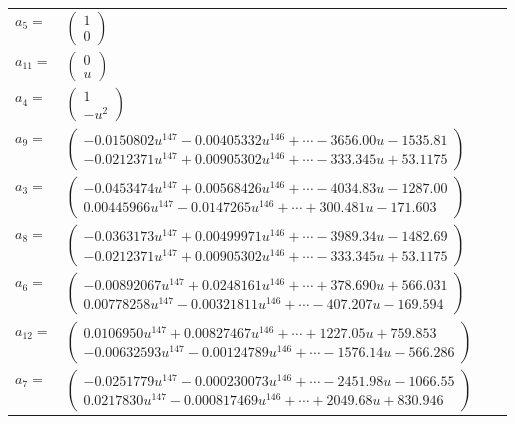 \documentclass[1p]{elsarticle_modified}
\theoremstyle{definition}
\begin{document}
\begin{tabular}{m{7pt} m{180pt} m{7pt} m{180pt} }
\flushright $a_{5}=$&$\begin{pmatrix}1\\0\end{pmatrix}$ \\
\flushright $a_{11}=$&$\begin{pmatrix}0\\u\end{pmatrix}$ \\
\flushright $a_{4}=$&$\begin{pmatrix}1\\- u^2\end{pmatrix}$ \\
\flushright $a_{9}=$&$\begin{pmatrix}-0.0150802 u^{147}-0.00405332 u^{146}+\cdots-3656.00 u-1535.81\\-0.0212371 u^{147}+0.00905302 u^{146}+\cdots-333.345 u+53.1175\end{pmatrix}$ \\
\flushright $a_{3}=$&$\begin{pmatrix}-0.0453474 u^{147}+0.00568426 u^{146}+\cdots-4034.83 u-1287.00\\0.00445966 u^{147}-0.0147265 u^{146}+\cdots+300.481 u-171.603\end{pmatrix}$ \\
\flushright $a_{8}=$&$\begin{pmatrix}-0.0363173 u^{147}+0.00499971 u^{146}+\cdots-3989.34 u-1482.69\\-0.0212371 u^{147}+0.00905302 u^{146}+\cdots-333.345 u+53.1175\end{pmatrix}$ \\
\flushright $a_{6}=$&$\begin{pmatrix}-0.00892067 u^{147}+0.0248161 u^{146}+\cdots+378.690 u+566.031\\0.00778258 u^{147}-0.00321811 u^{146}+\cdots-407.207 u-169.594\end{pmatrix}$ \\
\flushright $a_{12}=$&$\begin{pmatrix}0.0106950 u^{147}+0.00827467 u^{146}+\cdots+1227.05 u+759.853\\-0.00632593 u^{147}-0.00124789 u^{146}+\cdots-1576.14 u-566.286\end{pmatrix}$ \\
\flushright $a_{7}=$&$\begin{pmatrix}-0.0251779 u^{147}-0.000230073 u^{146}+\cdots-2451.98 u-1066.55\\0.0217830 u^{147}-0.000817469 u^{146}+\cdots+2049.68 u+830.946\end{pmatrix}$ \\

\end{tabular}
\end{document}
